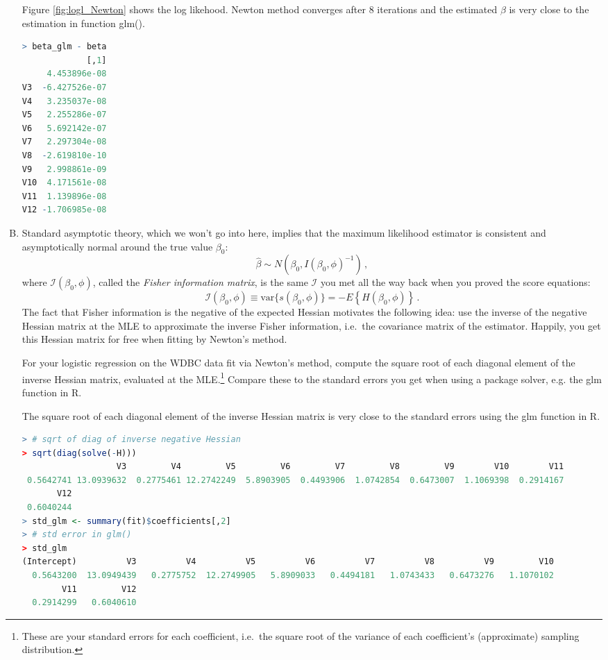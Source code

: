 \documentclass[11pt]{article}
\begin{document}
\begin{enumerate}[(A)]
Figure \ref{fig:logl_Newton} shows the log likehood. Newton method converges after 8 iterations and the estimated $\beta$ is very close to the estimation in function glm().

\begin{lstlisting}[language=R]
> beta_glm - beta
             [,1]
     4.453896e-08
V3  -6.427526e-07
V4   3.235037e-08
V5   2.255286e-07
V6   5.692142e-07
V7   2.297304e-08
V8  -2.619810e-10
V9   2.998861e-09
V10  4.171561e-08
V11  1.139896e-08
V12 -1.706985e-08
\end{lstlisting}

\bigskip

\item Standard asymptotic theory, which we won't go into here, implies that the maximum likelihood estimator is consistent and asymptotically normal around the true value $\beta_0$:
$$
\hat{\beta} \sim N(\beta_0, I(\beta_0, \phi)^{-1}) \, ,
$$
where $\mathcal{I}(\beta_0, \phi)$, called the \textit{Fisher information matrix}, is the same $\mathcal{I}$ you met all the way back when you proved the score equations:  
$$
\mathcal{I}(\beta_0, \phi) \equiv \mbox{var} \{ s(\beta_0, \phi) \}  = - E \left\{ H(\beta_0, \phi) \right\} \, .
$$
The fact that Fisher information is the negative of the expected Hessian motivates the following idea: use the inverse of the negative Hessian matrix at the MLE to approximate the inverse Fisher information, i.e.~the covariance matrix of the estimator.  Happily, you get this Hessian matrix for free when fitting by Newton's method.

For your logistic regression on the WDBC data fit via Newton's method, compute the square root of each diagonal element of the inverse Hessian matrix, evaluated at the MLE.\footnote{These are your standard errors for each coefficient, i.e.~the square root of the variance of each coefficient's (approximate) sampling distribution.}  Compare these to the standard errors you get when using a package solver, e.g. the glm function in R.  

The square root of each diagonal element of the inverse Hessian matrix is very close to the standard errors using the glm function in R.  
\begin{lstlisting}[language=R]
> # sqrt of diag of inverse negative Hessian
> sqrt(diag(solve(-H)))
                   V3         V4         V5         V6         V7         V8         V9        V10        V11 
 0.5642741 13.0939632  0.2775461 12.2742249  5.8903905  0.4493906  1.0742854  0.6473007  1.1069398  0.2914167 
       V12 
 0.6040244 
> std_glm <- summary(fit)$coefficients[,2]
> # std error in glm()
> std_glm
(Intercept)          V3          V4          V5          V6          V7          V8          V9         V10 
  0.5643200  13.0949439   0.2775752  12.2749905   5.8909033   0.4494181   1.0743433   0.6473276   1.1070102 
        V11         V12 
  0.2914299   0.6040610 
\end{lstlisting}


\end{enumerate}
\end{document}
